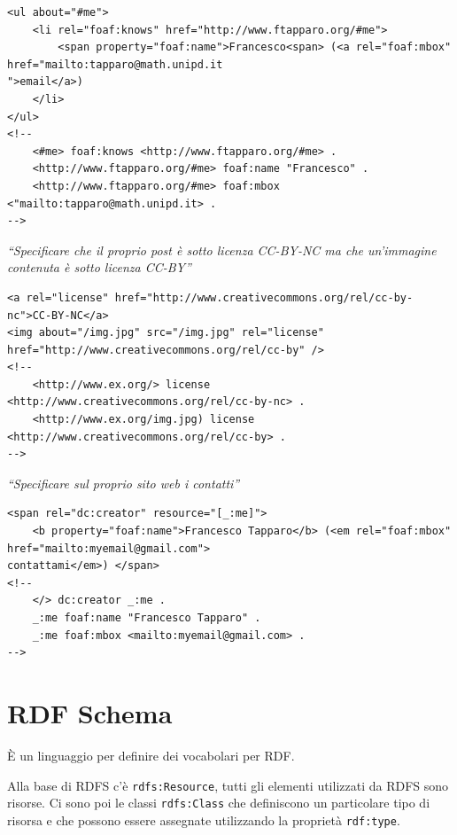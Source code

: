 \begin{lstlisting}[language=RDFA]
<ul about="#me">
	<li rel="foaf:knows" href="http://www.ftapparo.org/#me">
		<span property="foaf:name">Francesco<span> (<a rel="foaf:mbox" href="mailto:tapparo@math.unipd.it
">email</a>)
	</li>
</ul>
<!-- 
	<#me> foaf:knows <http://www.ftapparo.org/#me> .
	<http://www.ftapparo.org/#me> foaf:name "Francesco" .
	<http://www.ftapparo.org/#me> foaf:mbox <"mailto:tapparo@math.unipd.it> .
-->
\end{lstlisting}

\begin{center}
	\textit{``Specificare che il proprio post è sotto licenza CC-BY-NC ma che un'immagine contenuta è sotto licenza CC-BY''}
\end{center}

\begin{lstlisting}[language=RDFA]
<a rel="license" href="http://www.creativecommons.org/rel/cc-by-nc">CC-BY-NC</a>
<img about="/img.jpg" src="/img.jpg" rel="license" href="http://www.creativecommons.org/rel/cc-by" />
<!-- 
	<http://www.ex.org/> license <http://www.creativecommons.org/rel/cc-by-nc> .
	<http://www.ex.org/img.jpg) license <http://www.creativecommons.org/rel/cc-by> .
-->
\end{lstlisting}

\begin{center}
	\textit{``Specificare sul proprio sito web i contatti''}
\end{center}

\begin{lstlisting}[language=RDFA]
<span rel="dc:creator" resource="[_:me]">
	<b property="foaf:name">Francesco Tapparo</b> (<em rel="foaf:mbox" href="mailto:myemail@gmail.com">
contattami</em>) </span>
<!-- 
	</> dc:creator _:me .
	_:me foaf:name "Francesco Tapparo" .
	_:me foaf:mbox <mailto:myemail@gmail.com> .
-->
\end{lstlisting}

\section{RDF Schema}

\`E un linguaggio per definire dei vocabolari per RDF.

Alla base di RDFS c'è \texttt{rdfs:Resource}, tutti gli elementi utilizzati da RDFS sono risorse. Ci sono poi le classi \texttt{rdfs:Class} che definiscono un particolare tipo di risorsa e che possono essere assegnate utilizzando la proprietà \texttt{rdf:type}.

